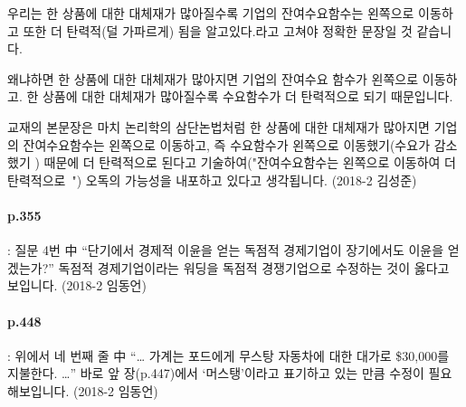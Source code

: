 \documentclass[a4paper]{article}
\begin{document}
우리는 한 상품에 대한 대체재가 많아질수록 기업의 잔여수요함수는 왼쪽으로 이동하고 또한 더 탄력적(덜 가파르게) 됨을 알고있다.라고 고쳐야 정확한 문장일 것 같습니다.

왜냐하면 한 상품에 대한 대체재가 많아지면 기업의 잔여수요 함수가 왼쪽으로 이동하고. 한 상품에 대한 대체재가 많아질수록 수요함수가 더 탄력적으로 되기 때문입니다.

교재의 본문장은 마치 논리학의 삼단논법처럼 한 상품에 대한 대체재가 많아지면 기업의 잔여수요함수는 왼쪽으로 이동하고, 즉 수요함수가 왼쪽으로 이동했기(수요가 감소했기 ) 때문에 더 탄력적으로 된다고 기술하여("잔여수요함수는 왼쪽으로 이동하여 더탄력적으로~")  오독의 가능성을 내포하고 있다고 생각됩니다. (2018-2 김성준)
\paragraph{p.355} %
\label{par:p_355}
: 질문 4번 中 “단기에서 경제적 이윤을 얻는 독점적 경제기업이 장기에서도 이윤을 얻겠는가?”
독점적 경제기업이라는 워딩을 독점적 경쟁기업으로 수정하는 것이 옳다고 보입니다. (2018-2 임동언)
\paragraph{p.448} %
\label{par:p_448}
: 위에서 네 번째 줄 中 “… 가계는 포드에게 무스탕 자동차에 대한 대가로 \$30,000를 지불한다. …”
바로 앞 장(p.447)에서 ‘머스탱’이라고 표기하고 있는 만큼 수정이 필요해보입니다. (2018-2 임동언)
\end{document}
